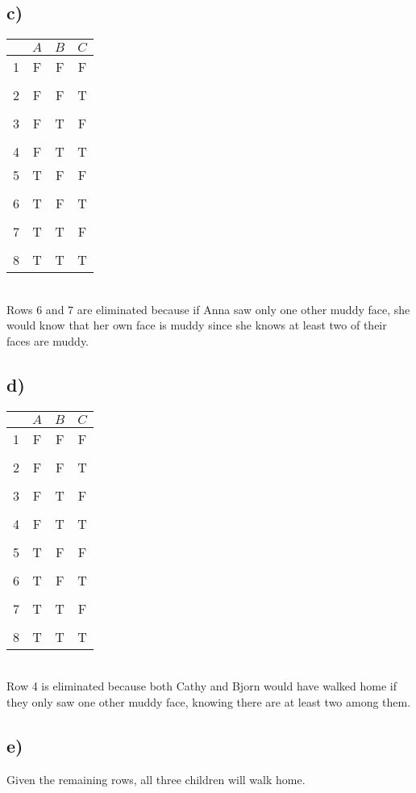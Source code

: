 \documentclass{article}
\begin{document}
\subsection*{c)}
\begin{tabular}{c | c | c | c |}
    & $A$ & $B$ & $C$ \\ \hline
    1 & F & F & F \\ [-1.75ex] \hline \\ [-1.2ex] \hline
    2 & F & F & T \\ [-1.75ex] \hline \\ [-1.2ex] \hline
    3 & F & T & F \\ [-1.75ex] \hline \\ [-1.2ex] \hline
    4 & F & T & T \\ \hline
    5 & T & F & F \\ [-1.75ex] \hline \\ [-1.2ex] \hline
    6 & T & F & T \\ [-1.75ex] \hline \\ [-1.2ex] \hline
    7 & T & T & F \\ [-1.75ex] \hline \\ [-1.2ex] \hline
    8 & T & T & T \\
\end{tabular}\\
Rows 6 and 7 are eliminated because if Anna saw only one other muddy face, she would know that her own face is muddy since she knows at least two of their faces are muddy.\\
\subsection*{d)}
\begin{tabular}{c | c | c | c |}
    & $A$ & $B$ & $C$ \\ \hline
    1 & F & F & F \\ [-1.75ex] \hline \\ [-1.2ex] \hline
    2 & F & F & T \\ [-1.75ex] \hline \\ [-1.2ex] \hline
    3 & F & T & F \\ [-1.75ex] \hline \\ [-1.2ex] \hline
    4 & F & T & T \\ [-1.75ex] \hline \\ [-1.2ex] \hline
    5 & T & F & F \\ [-1.75ex] \hline \\ [-1.2ex] \hline
    6 & T & F & T \\ [-1.75ex] \hline \\ [-1.2ex] \hline
    7 & T & T & F \\ [-1.75ex] \hline \\ [-1.2ex] \hline
    8 & T & T & T \\
\end{tabular}\\
Row 4 is eliminated because both Cathy and Bjorn would have walked home if they only saw one other muddy face, knowing there are at least two among them.\\
\subsection*{e)}
Given the remaining rows, all three children will walk home.
\end{document}
